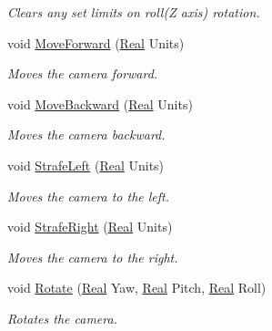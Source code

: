 \begin{DoxyCompactItemize}
\begin{DoxyCompactList}\small\item\em Clears any set limits on roll(Z axis) rotation. \item\end{DoxyCompactList}\item 
void \hyperlink{classphys_1_1CameraController_a8763326e900562dd6e934f79d52d5d50}{MoveForward} (\hyperlink{namespacephys_af7eb897198d265b8e868f45240230d5f}{Real} Units)
\begin{DoxyCompactList}\small\item\em Moves the camera forward. \item\end{DoxyCompactList}\item 
void \hyperlink{classphys_1_1CameraController_a932450504666cf4820339deb3651bfb3}{MoveBackward} (\hyperlink{namespacephys_af7eb897198d265b8e868f45240230d5f}{Real} Units)
\begin{DoxyCompactList}\small\item\em Moves the camera backward. \item\end{DoxyCompactList}\item 
void \hyperlink{classphys_1_1CameraController_a1b2e0c40120c3604f1929d5fac3cd61f}{StrafeLeft} (\hyperlink{namespacephys_af7eb897198d265b8e868f45240230d5f}{Real} Units)
\begin{DoxyCompactList}\small\item\em Moves the camera to the left. \item\end{DoxyCompactList}\item 
void \hyperlink{classphys_1_1CameraController_ad494cf9a1e3e233319799116424ad43f}{StrafeRight} (\hyperlink{namespacephys_af7eb897198d265b8e868f45240230d5f}{Real} Units)
\begin{DoxyCompactList}\small\item\em Moves the camera to the right. \item\end{DoxyCompactList}\item 
void \hyperlink{classphys_1_1CameraController_a3ad0f3ecf0777a8feb2e4f22f2d644bf}{Rotate} (\hyperlink{namespacephys_af7eb897198d265b8e868f45240230d5f}{Real} Yaw, \hyperlink{namespacephys_af7eb897198d265b8e868f45240230d5f}{Real} Pitch, \hyperlink{namespacephys_af7eb897198d265b8e868f45240230d5f}{Real} Roll)
\begin{DoxyCompactList}\small\item\em Rotates the camera. \item\end{DoxyCompactList}\item 

\end{DoxyCompactItemize}
